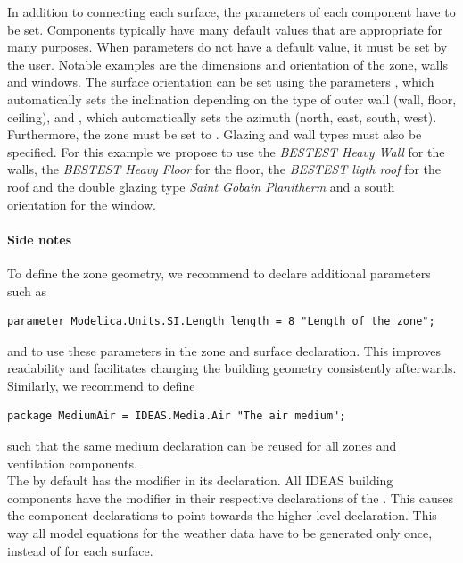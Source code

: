 \documentclass[10pt,a4paper]{article}
\begin{document}
In addition to connecting each surface, the parameters of each component have to be set. 
Components typically have many default values that are appropriate for many purposes.
When parameters do not have a default value, it must be set by the user. 
Notable examples are the dimensions and orientation of the zone, walls and windows. 
The surface orientation can be set using the parameters , which automatically sets the inclination depending on the type of outer wall (wall, floor, ceiling), and , which automatically sets the azimuth (north, east, south, west).
Furthermore, the zone  must be set to .
Glazing and wall types must also be specified.
For this example we propose to use the \textit{BESTEST Heavy Wall} for the walls, the \textit{BESTEST Heavy Floor} for the floor, the \textit{BESTEST ligth roof} for the roof
and the double glazing type \textit{Saint Gobain Planitherm} and a south orientation for the window.

\paragraph{Side notes}
To define the zone geometry, 
we recommend to declare additional parameters such as
\begin{verbatim}
parameter Modelica.Units.SI.Length length = 8 "Length of the zone";
\end{verbatim}
and to use these parameters in the zone and surface declaration. 
This improves readability and facilitates changing the building geometry consistently afterwards.\\

Similarly, we recommend to define
\begin{verbatim}
package MediumAir = IDEAS.Media.Air "The air medium";
\end{verbatim}
such that the same medium declaration can be reused for all zones and ventilation components.\\

The  by default has the modifier  in its declaration. 
All IDEAS building components have the modifier  in their respective 
declarations of the . 
This causes the component declarations to point towards the higher level 
declaration. This way all model equations for the weather data have to be generated only once,
instead of for each surface.

\newpage
\end{document}
